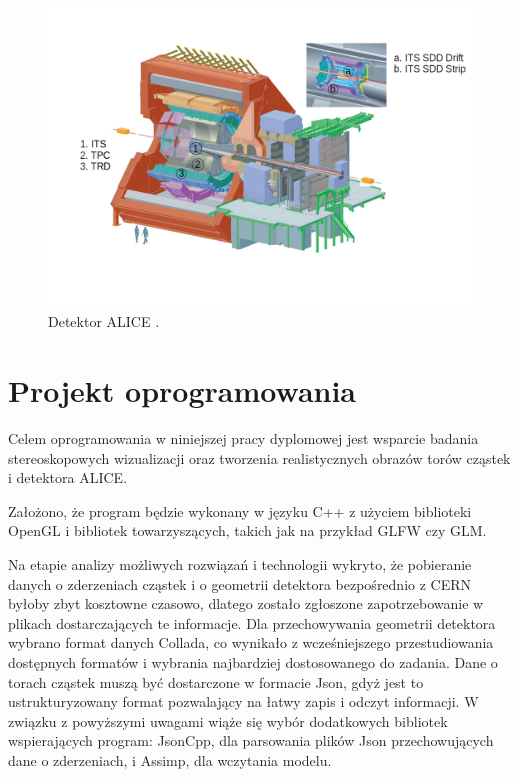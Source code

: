 \begin{figure}[H]
		\centering
 		\includegraphics[width=16.0cm]{detector.png}
    	\caption{Detektor ALICE \cite{aliceofficial}.}
 		\label{rys9}
\end{figure}
\newpage
\section{Projekt oprogramowania}
Celem oprogramowania w niniejszej pracy dyplomowej jest wsparcie badania stereoskopowych wizualizacji oraz tworzenia realistycznych obrazów torów cząstek i detektora ALICE. 

Założono, że program będzie wykonany w języku C++ z użyciem biblioteki OpenGL i bibliotek towarzyszących, takich jak na przykład  GLFW czy GLM.

Na etapie analizy możliwych rozwiązań i technologii wykryto, że pobieranie danych o zderzeniach cząstek i o geometrii detektora bezpośrednio z CERN byłoby zbyt kosztowne czasowo, dlatego zostało zgłoszone zapotrzebowanie w plikach dostarczających te informacje. Dla przechowywania geometrii detektora wybrano format danych Collada, co wynikało z wcześniejszego przestudiowania dostępnych formatów i wybrania najbardziej dostosowanego do zadania. Dane o torach cząstek muszą być dostarczone w formacie Json, gdyż jest to ustrukturyzowany format pozwalający na łatwy zapis i odczyt informacji. W związku z powyższymi uwagami wiąże się wybór dodatkowych bibliotek wspierających program: JsonCpp, dla parsowania plików Json przechowujących dane o zderzeniach, i Assimp, dla wczytania modelu.

